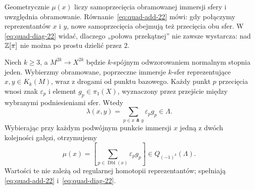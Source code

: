 Geometrycznie $\mu(x)$ liczy samoprzecięcia
obramowanej immersji sfery i uwzględnia obramowanie.
Równanie~\eqref{eq:quad-add-22} mówi:
gdy połączymy reprezentantów $x$ i $y$, nowe
samoprzecięcia obejmują też przecięcia obu sfer.
W \eqref{eq:quad-diag-22} widać, dlaczego
„połowa przekątnej” nie zawsze wystarcza:
nad $\mathbb{Z}[\pi]$ nie można po prostu dzielić przez $2$.

\begin{stwierdzenie}
\label{prop:rachunek-przeciec-Wall-22}
Niech $k\geq3$, a $M^{2k}\to X^{2k}$ będzie
$k$-spójnym odwzorowaniem normalnym stopnia jeden.
Wybierzmy obramowane, poprzeczne immersje
$k$-sfer reprezentujące $x,y\in K_k(M)$,
wraz z drogami od punktu bazowego. Każdy punkt
$p$ przecięcia wnosi znak $\varepsilon_p$ i element
$g_p\in\pi_1(X)$, wyznaczony przez przejście
między wybranymi podniesieniami sfer. Wtedy
\[
 \lambda(x,y)=\sum_{p\in x\pitchfork y}
                  \varepsilon_p g_p\in\Lambda.
\]
Wybierając przy każdym podwójnym punkcie immersji
$x$ jedną z dwóch kolejności gałęzi, otrzymujemy
\[
 \mu(x)=\left[\sum_{p\in\operatorname{Dbl}(x)}
                 \varepsilon_p g_p\right]
                 \in Q_{(-1)^k}(\Lambda).
\]
Wartości te nie zależą od regularnej homotopii
reprezentantów; spełniają
\eqref{eq:quad-add-22} i~\eqref{eq:quad-diag-22}.
\end{stwierdzenie}
